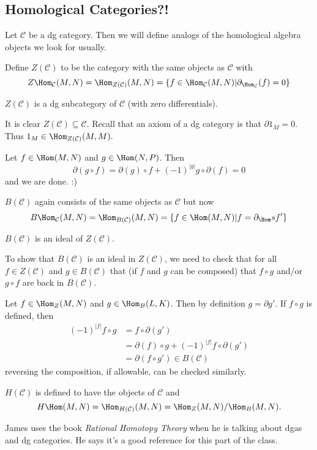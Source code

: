 \documentclass[12pt]{article}
\begin{document}
\subsection{Homological Categories?!}
Let $\mathcal C$ be a dg category. Then we will define analogs of the homological algebra objects 
we look for usually.
\begin{defn}
	Define $Z(\mathcal C)$ to be the category with the same objects as $\mathcal C$ with 
	\[Z\Hom_{\mathcal C}(M,N)=\Hom_{Z(\mathcal C)}(M,N)=\{f\in \Hom_{\mathcal C}(M,N)|\partial_{\Hom_{\mathcal C}}(f)=0\}\]
\end{defn}
\begin{lem}
	$Z(\mathcal C)$ is a dg subcategory of $\mathcal C$ (with zero differentials).
\end{lem}
\begin{prf}
	It is clear $Z(\mathcal C)\subseteq \mathcal C$. Recall that an axiom of a dg category is that $\partial 1_M=0.$
	Thus $1_M\in \Hom_{Z(\mathcal C)}(M,M). $

	Let $f\in\Hom(M,N)$ and $g\in\Hom(N,P)$. Then 
	\[\partial(g\circ f)=\partial (g)\circ f+(-1)^{|g|}g\circ \partial(f)=0\]
	and we are done. :)
\end{prf}
\begin{defn}
	$B(\mathcal C)$ again consists of the same objects as $\mathcal C$ but now 
	\[B\Hom_{\mathcal C}(M,N)=\Hom_{B(\mathcal C)}(M,N)=\{f\in \Hom(M,N)|f=\partial_{\Hom}s f'\}\]
\end{defn}
\begin{lem}
	$B(\mathcal C)$ is an ideal of $Z(\mathcal C)$.
\end{lem}
\begin{rmk}
	To show that $B(\mathcal C)$ is an ideal in $Z(\mathcal C)$, we need to check that for all $f\in Z(\mathcal C)$ and $g\in B(\mathcal C)$
	that (if $f$ and $g$ can be composed) that $f\circ g$ and/or $g\circ f$ are back in $B(\mathcal C)$.
\end{rmk}
\begin{prf}
	Let $f\in \Hom_Z(M,N)$ and $g\in\Hom_B(L,K)$. Then by definition $g=\partial g'$. If $f\circ g$ 
	is defined, then 
	\begin{align*}
		(-1)^{|f|}f\circ g &= f\circ \partial(g')\\
		&= \partial(f)\circ g +(-1)^{|f|}f\circ\partial(g')\\
		&=\partial(f\circ g')\in B(\mathcal C)
	\end{align*}
	reversing the composition, if allowable, can be checked similarly.
\end{prf}
\begin{defn}
	$H(\mathcal C)$ is defined to have the objects of $\mathcal C$ and
	\[H\Hom(M,N)=\Hom_{H(\mathcal C)}(M,N)=\Hom_Z(M,N)/\Hom_B(M,N).\]
\end{defn}
James uses the book \textit{Rational Homotopy Theory} when he is talking about dgas and dg categories.
He says it's a good reference for this part of the class.
\end{document}
